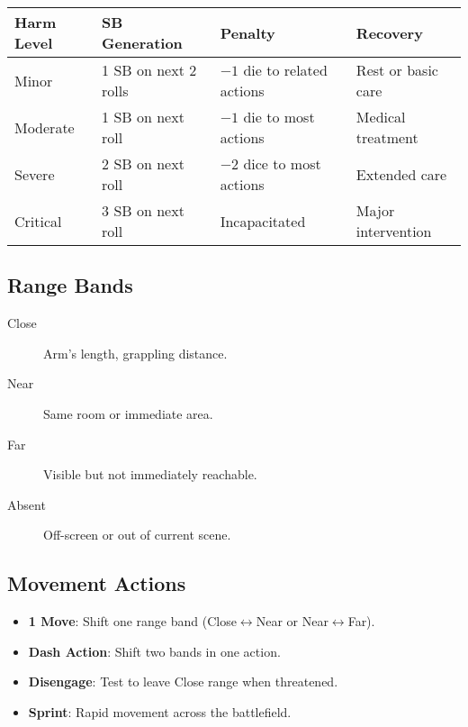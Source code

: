 \begin{center}
\feTableStart
\begin{tabularx}{\linewidth}{@{}l l l l @{}}
\toprule
\textbf{Harm Level} & \textbf{SB Generation} & \textbf{Penalty} & \textbf{Recovery} \\
\midrule
Minor & 1 SB on next 2 rolls & $-1$ die to related actions & Rest or basic care \\
Moderate & 1 SB on next roll & $-1$ die to most actions & Medical treatment \\
Severe & 2 SB on next roll & $-2$ dice to most actions & Extended care \\
Critical & 3 SB on next roll & Incapacitated & Major intervention \\
\bottomrule
\end{tabularx}
\feTableEnd
\end{center}

\subsection{Range Bands}
\label{subsec:range-bands-ref}

\begin{description}
\item[Close] Arm's length, grappling distance.
\item[Near] Same room or immediate area.
\item[Far] Visible but not immediately reachable.
\item[Absent] Off-screen or out of current scene.
\end{description}

\subsection{Movement Actions}
\label{subsec:movement-ref}

\begin{itemize}
\item \textbf{1 Move}: Shift one range band (Close$\leftrightarrow$Near or Near$\leftrightarrow$Far).
\item \textbf{Dash Action}: Shift two bands in one action.
\item \textbf{Disengage}: Test to leave Close range when threatened.
\item \textbf{Sprint}: Rapid movement across the battlefield.
\end{itemize}

